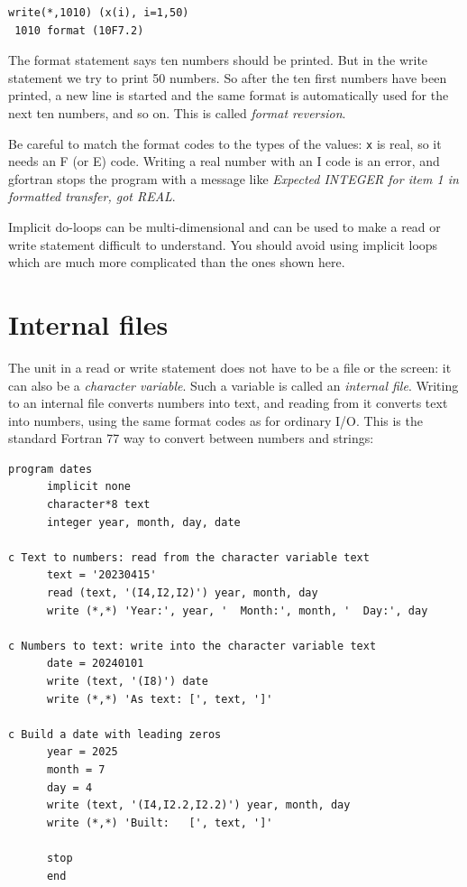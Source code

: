 \begin{lstlisting}[style=fortran77]
      write(*,1010) (x(i), i=1,50)
 1010 format (10F7.2)
\end{lstlisting}

The format statement says ten numbers should be printed. But in the write statement we try to print 50 numbers. So after the ten first numbers have been printed, a new line is started and the same format is automatically used for the next ten numbers, and so on. This is called \emph{format reversion}.

Be careful to match the format codes to the types of the values: \texttt{x} is real, so it needs an F (or E) code. Writing a real number with an I code is an error, and gfortran stops the program with a message like \emph{Expected INTEGER for item 1 in formatted transfer, got REAL}.

Implicit do-loops can be multi-dimensional and can be used to make a read or write statement difficult to understand. You should avoid using implicit loops which are much more complicated than the ones shown here.

\section{Internal files}
\label{sec:internal-files}

The unit in a read or write statement does not have to be a file or the screen: it can also be a \emph{character variable}. Such a variable is called an \emph{internal file}. Writing to an internal file converts numbers into text, and reading from it converts text into numbers, using the same format codes as for ordinary I/O. This is the standard Fortran 77 way to convert between numbers and strings:

\begin{lstlisting}[style=fortran77]
      program dates
      implicit none
      character*8 text
      integer year, month, day, date

c Text to numbers: read from the character variable text
      text = '20230415'
      read (text, '(I4,I2,I2)') year, month, day
      write (*,*) 'Year:', year, '  Month:', month, '  Day:', day

c Numbers to text: write into the character variable text
      date = 20240101
      write (text, '(I8)') date
      write (*,*) 'As text: [', text, ']'

c Build a date with leading zeros
      year = 2025
      month = 7
      day = 4
      write (text, '(I4,I2.2,I2.2)') year, month, day
      write (*,*) 'Built:   [', text, ']'

      stop
      end
\end{lstlisting}

